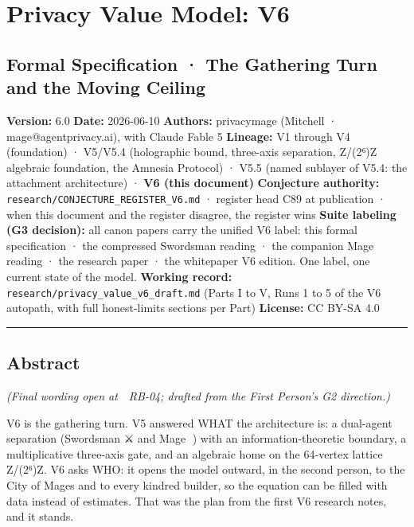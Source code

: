 \documentclass[
  11pt,
]{article}
\author{}
\date{}
\begin{document}
\section{Privacy Value Model: V6}\label{privacy-value-model-v6}

\subsection{Formal Specification · The Gathering Turn and the Moving
Ceiling}\label{formal-specification-the-gathering-turn-and-the-moving-ceiling}

\textbf{Version:} 6.0 \textbf{Date:} 2026-06-10 \textbf{Authors:}
privacymage (Mitchell · mage@agentprivacy.ai), with Claude Fable 5
\textbf{Lineage:} V1 through V4 (foundation) · V5/V5.4 (holographic
bound, three-axis separation, Z/(2⁶)Z algebraic foundation, the Amnesia
Protocol) · V5.5 (named sublayer of V5.4: the attachment architecture) ·
\textbf{V6 (this document)} \textbf{Conjecture authority:}
\texttt{research/CONJECTURE\_REGISTER\_V6.md} · register head C89 at
publication · when this document and the register disagree, the register
wins \textbf{Suite labeling (G3 decision):} all canon papers carry the
unified V6 label: this formal specification · the compressed Swordsman
reading · the companion Mage reading · the research paper · the
whitepaper V6 edition. One label, one current state of the model.
\textbf{Working record:} \texttt{research/privacy\_value\_v6\_draft.md}
(Parts I to V, Runs 1 to 5 of the V6 autopath, with full honest-limits
sections per Part) \textbf{License:} CC BY-SA 4.0

\begin{center}\rule{0.5\linewidth}{0.5pt}\end{center}

\subsection{Abstract}\label{abstract}

\emph{(Final wording open at 📖 RB-04; drafted from the First Person's
G2 direction.)}

V6 is the gathering turn. V5 answered WHAT the architecture is: a
dual-agent separation (Swordsman ⚔️ and Mage 🧙) with an
information-theoretic boundary, a multiplicative three-axis gate, and an
algebraic home on the 64-vertex lattice Z/(2⁶)Z. V6 asks WHO: it opens
the model outward, in the second person, to the City of Mages and to
every kindred builder, so the equation can be filled with data instead
of estimates. That was the plan from the first V6 research notes, and it
stands.
\end{document}
